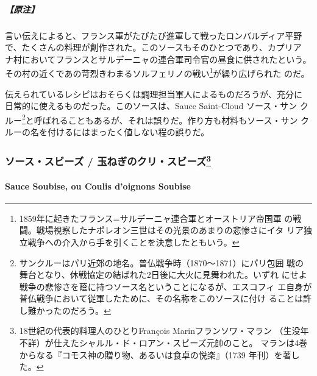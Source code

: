 \begin{recette}
\hypertarget{ux539fux6ce8-17}{%
\subparagraph{【原注】}\label{ux539fux6ce8-17}}

言い伝えによると、フランス軍がたびたび進軍して戦ったロンバルディア平野
で、たくさんの料理が創作された。このソースもそのひとつであり、カプリア
ナ村においてフランスとサルデーニャの連合軍司令官の昼食に供されたという。
その村の近くであの苛烈きわまるソルフェリノの戦い\footnote{1859年に起きたフランス=サルデーニャ連合軍とオーストリア帝国軍
  の戦闘。戦場視察したナポレオン三世はその光景のあまりの悲惨さにイタ
  リア独立戦争への介入から手を引くことを決意したともいう。}が繰り広げられた
のだ。

伝えられているレシピはおそらくは調理担当軍人によるものだろうが、充分に
日常的に使えるものだった。このソースは、Sauce Saint-Cloud ソース・サン
クルー\footnote{サンクルーはパリ近郊の地名。普仏戦争時（1870〜1871）にパリ包囲
  戦の舞台となり、休戦協定の結ばれた2日後に大火に見舞われた。いずれ
  にせよ戦争の悲惨さを蔭に持つソース名ということになるが、エスコフィ
  エ自身が普仏戦争において従軍したために、その名称をこのソースに付け
  ることは許し難かったのだろう。}と呼ばれることもあるが、それは誤りだ。作り方も材料もソース・サン
クルーの名を付けるにはまったく値しない程の誤りだ。

\maeaki

\hypertarget{ux30bdux30fcux30b9ux30b9ux30d3ux30fcux30ba-ux7389ux306dux304eux306eux30afux30eaux30b9ux30d3ux30fcux30ba137}{%
\subsubsection[ソース・スビーズ /
玉ねぎのクリ・スビーズ]{\texorpdfstring{ソース・スビーズ /
玉ねぎのクリ・スビーズ\footnote{18世紀の代表的料理人のひとりFrançois
  Marinフランソワ・マラン
  （生没年不詳）が仕えたシャルル・ド・ロアン・スビーズ元帥のこと。
  マランは4巻からなる『コモス神の贈り物、あるいは食卓の悦楽』（1739
  年刊）を著した。}}{ソース・スビーズ / 玉ねぎのクリ・スビーズ}}\label{ux30bdux30fcux30b9ux30b9ux30d3ux30fcux30ba-ux7389ux306dux304eux306eux30afux30eaux30b9ux30d3ux30fcux30ba137}}

\hypertarget{sauce-soubise-ou-coulis-doignons-soubise}{%
\paragraph{Sauce Soubise, ou Coulis d'oignons
Soubise}\label{sauce-soubise-ou-coulis-doignons-soubise}}



\end{recette}
